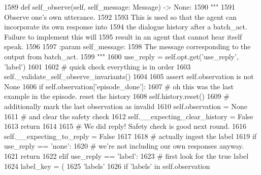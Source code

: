\begin{DoxyCode}
1589     \textcolor{keyword}{def }self\_observe(self, self\_message: Message) -> \textcolor{keywordtype}{None}:
1590         \textcolor{stringliteral}{"""}
1591 \textcolor{stringliteral}{        Observe one's own utterance.}
1592 \textcolor{stringliteral}{}
1593 \textcolor{stringliteral}{        This is used so that the agent can incorporate its own response into}
1594 \textcolor{stringliteral}{        the dialogue history after a batch\_act. Failure to implement this will}
1595 \textcolor{stringliteral}{        result in an agent that cannot hear itself speak.}
1596 \textcolor{stringliteral}{}
1597 \textcolor{stringliteral}{        :param self\_message:}
1598 \textcolor{stringliteral}{            The message corresponding to the output from batch\_act.}
1599 \textcolor{stringliteral}{        """}
1600         use\_reply = self.opt.get(\textcolor{stringliteral}{'use\_reply'}, \textcolor{stringliteral}{'label'})
1601 
1602         \textcolor{comment}{# quick check everything is in order}
1603         self.\_validate\_self\_observe\_invariants()
1604 
1605         \textcolor{keyword}{assert} self.observation \textcolor{keywordflow}{is} \textcolor{keywordflow}{not} \textcolor{keywordtype}{None}
1606         \textcolor{keywordflow}{if} self.observation[\textcolor{stringliteral}{'episode\_done'}]:
1607             \textcolor{comment}{# oh this was the last example in the episode. reset the history}
1608             self.history.reset()
1609             \textcolor{comment}{# additionally mark the last observation as invalid}
1610             self.observation = \textcolor{keywordtype}{None}
1611             \textcolor{comment}{# and clear the safety check}
1612             self.\_\_expecting\_clear\_history = \textcolor{keyword}{False}
1613             \textcolor{keywordflow}{return}
1614 
1615         \textcolor{comment}{# We did reply! Safety check is good next round.}
1616         self.\_\_expecting\_to\_reply = \textcolor{keyword}{False}
1617 
1618         \textcolor{comment}{# actually ingest the label}
1619         \textcolor{keywordflow}{if} use\_reply == \textcolor{stringliteral}{'none'}:
1620             \textcolor{comment}{# we're not including our own responses anyway.}
1621             \textcolor{keywordflow}{return}
1622         \textcolor{keywordflow}{elif} use\_reply == \textcolor{stringliteral}{'label'}:
1623             \textcolor{comment}{# first look for the true label}
1624             label\_key = (
1625                 \textcolor{stringliteral}{'labels'}
1626                 \textcolor{keywordflow}{if} \textcolor{stringliteral}{'labels'} \textcolor{keywordflow}{in} self.observation

\end{DoxyCode}
